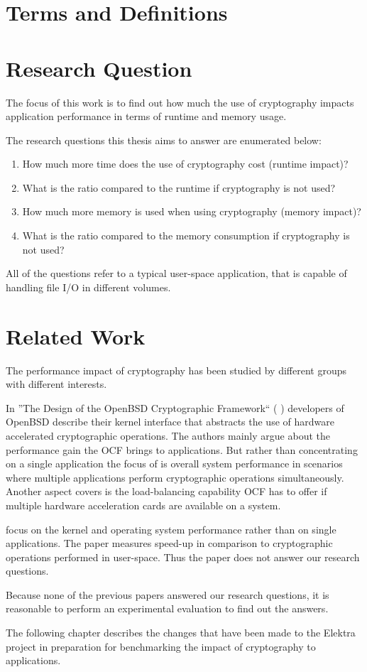 \section{Terms and Definitions}

\section{Research Question}

The focus of this work is to find out how much the use of cryptography
impacts application performance in terms of runtime and memory
usage.

The research questions this thesis aims to answer are enumerated below:

\begin{enumerate}
\def\labelenumi{\arabic{enumi}.}
\tightlist
\item
  How much more time does the use of cryptography cost (runtime impact)?
\item
  What is the ratio compared to the runtime if cryptography is not used?
\item
  How much more memory is used when using cryptography (memory impact)?
\item
  What is the ratio compared to the memory consumption if cryptography
  is not used?
\end{enumerate}

All of the questions refer to a typical user-space application, that is capable of handling file I/O in different volumes.

\section{Related Work}

The performance impact of cryptography has been studied by different groups with different interests.

In ''The Design of the OpenBSD Cryptographic Framework`` ( \cite{ocf} ) developers of OpenBSD describe their kernel interface that abstracts the use of hardware accelerated cryptographic operations.
The authors mainly argue about the performance gain the OCF brings to applications.
But rather than concentrating on a single application the focus of \cite{ocf} is overall system performance in scenarios where multiple applications perform cryptographic operations simultaneously.
Another aspect \cite{ocf} covers is the load-balancing capability OCF has to offer if multiple hardware acceleration cards are available on a system.

\cite{ocf} focus on the kernel and operating system performance rather than on single applications.
The paper measures speed-up in comparison to cryptographic operations performed in user-space.
Thus the paper does not answer our research questions.


Because none of the previous papers answered our research questions, it is reasonable to perform an experimental evaluation to find out the answers.

The following chapter describes the changes that have been made to the Elektra project in preparation for benchmarking the impact of cryptography to applications.
